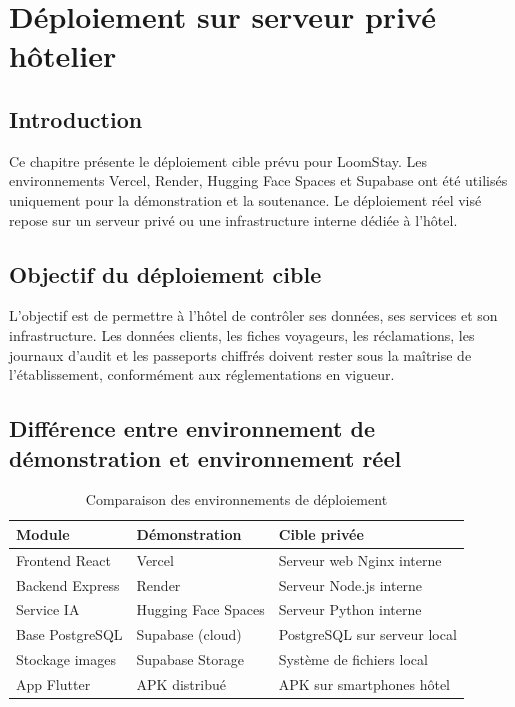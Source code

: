 \chapter{Déploiement sur serveur privé hôtelier}
\label{chap:deploiement}

\section*{Introduction}
Ce chapitre présente le déploiement cible prévu pour LoomStay. Les environnements Vercel, Render, Hugging Face Spaces et Supabase ont été utilisés uniquement pour la démonstration et la soutenance. Le déploiement réel visé repose sur un serveur privé ou une infrastructure interne dédiée à l'hôtel.

\section{Objectif du déploiement cible}
L'objectif est de permettre à l'hôtel de contrôler ses données, ses services et son infrastructure. Les données clients, les fiches voyageurs, les réclamations, les journaux d'audit et les passeports chiffrés doivent rester sous la maîtrise de l'établissement, conformément aux réglementations en vigueur.

\section{Différence entre environnement de démonstration et environnement réel}

\begin{table}[H]
\centering
\caption{Comparaison des environnements de déploiement}
\small
\begin{tabularx}{\textwidth}{|p{3cm}|X|X|}
\hline
\textbf{Module} & \textbf{Démonstration} & \textbf{Cible privée} \\ \hline
Frontend React & Vercel & Serveur web Nginx interne \\ \hline
Backend Express & Render & Serveur Node.js interne \\ \hline
Service IA & Hugging Face Spaces & Serveur Python interne \\ \hline
Base PostgreSQL & Supabase (cloud) & PostgreSQL sur serveur local \\ \hline
Stockage images & Supabase Storage & Système de fichiers local \\ \hline
App Flutter & APK distribué & APK sur smartphones hôtel \\ \hline
\end{tabularx}
\label{tab:deploiement_comparaison}
\end{table}

